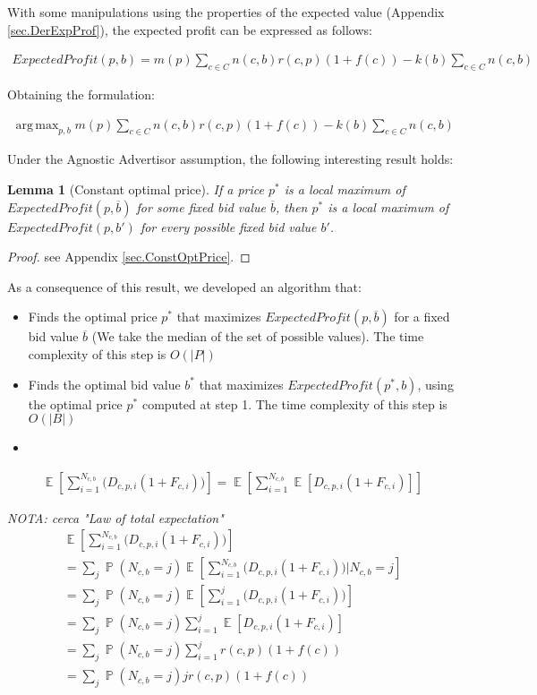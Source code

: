 \documentclass[11pt]{article} %
\DeclareMathOperator{\EX}{\mathbb{E}}
\DeclareMathOperator{\Prob}{\mathbb{P}}
\DeclareMathOperator*{\argmax}{arg\,max}
\newtheorem*{lemma}{Lemma}
\begin{document}
With some manipulations using the properties of the expected value (Appendix \ref{sec.DerExpProf}), the expected profit can be expressed as follows:

\begin{align*}
ExpectedProfit(p,b)=m(p)\sum_{c \in C}{n(c,b)r(c,p)(1+f(c))}-k(b)\sum_{c \in C}{n(c,b)}
\end{align*}

Obtaining the formulation:

\begin{align*}
\argmax_{p,b}{m(p)\sum_{c \in C}{n(c,b)r(c,p)(1+f(c))}-k(b)\sum_{c \in C}{n(c,b)}}
\end{align*}

Under the Agnostic Advertisor assumption, the following interesting result holds:

\begin{lemma}[Constant optimal price]
If a price $p^*$ is a local maximum of $ExpectedProfit(p,\overline b)$ for some fixed bid value $\overline b$,  then $p^*$ is a local maximum of $ExpectedProfit(p,b')$  for every possible fixed bid value $b'$.
\end{lemma}
\begin{proof}
see Appendix \ref{sec.ConstOptPrice}.
\end{proof}

As a consequence of this result, we developed an algorithm that:
\begin{itemize}
\item Finds the optimal price $p^*$ that maximizes $ExpectedProfit(p,\overline b)$ for a fixed bid value $\overline b$ (We take the median of the set of possible values). The time complexity of this step is $O(|P|)$
\item Finds the optimal bid value $b^*$ that maximizes $ExpectedProfit(p^*, b)$, using the optimal price $p^*$ computed at step 1. The time complexity of this step is $O(|B|)$
\item 
\end{itemize}


{\color{red}
\begin{align*}
\EX\left[\sum_{i =1}^{N_{c,b}}{\bigg( D_{c,p,i}(1+F_{c,i})\bigg)}\right]=\EX\left[\sum_{i =1}^{N_{c,b}}{\EX[D_{c,p,i}(1+F_{c,i})]}\right]
\end{align*}

\textit{NOTA: cerca "Law of total expectation"}
\begin{align*}
\EX\left[\sum_{i =1}^{N_{c,b}}{\bigg( D_{c,p,i}(1+F_{c,i})\bigg)}\right]\\
=\sum_{j}{\Prob(N_{c,b}=j)\EX\left[\sum_{i =1}^{N_{c,b}}{\bigg( D_{c,p,i}(1+F_{c,i})\bigg)}|N_{c,b}=j\right]}\\
=\sum_{j}{\Prob(N_{c,b}=j)\EX\left[\sum_{i =1}^{j}{\bigg( D_{c,p,i}(1+F_{c,i})\bigg)}\right]}\\
=\sum_{j}{\Prob(N_{c,b}=j)\sum_{i =1}^{j}{\EX\left[ D_{c,p,i}(1+F_{c,i})\right]}}\\
=\sum_{j}{\Prob(N_{c,b}=j)\sum_{i =1}^{j}{ r(c,p)(1+f(c))}}\\
=\sum_{j}{\Prob(N_{c,b}=j) jr(c,p)(1+f(c))}
\end{align*}
}
\end{document}
